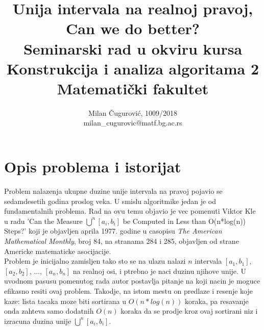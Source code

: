 \documentclass[a4paper]{article}
\begin{document}
\title{Unija intervala na realnoj pravoj, \\ Can we do better? \\  \small{Seminarski rad u okviru kursa\\Konstrukcija i analiza algoritama 2\\ Matematički fakultet}}

\author{Milan Čugurović, 1009/2018\\ milan\_cugurovic@matf.bg.ac.rs}
\maketitle


\tableofcontents

\newpage

\section{Opis problema i istorijat}
Problem nalazenja ukupne duzine unije intervala na pravoj pojavio se sedamdesetih godina proslog veka. U smislu algoritmike jedan je od fundamentalnih problema. Rad na ovu temu objavio je vec pomenuti Viktor Kle u radu 'Can the Measure $\bigcup^n [a_i, b_i]$ be Computed in Less than O(n*log(n)) Steps?'\cite{vklee} koji je objavljen aprila 1977. godine u casopisu \textit{The American Mathematical Monthly}, broj 84, na stranama 284 i 285, objavljen od strane Americke matematicke asocijacije. \\

Problem je inicijalno zamisljen tako sto se na ulazu nalazi $n$ intervala $[a_1, b_1]$, $[a_2, b_2]$, ..., $[a_n, b_n]$ na realnoj osi, i ptrebno je naci duzinu njihove unije. U uvodnom pasusu pomenutog rada autor postavlja pitanje na koji nacin je moguce efikasno resiti ovaj problem. Takodje, na istom mestu on predlaze i resenje koje kaze: lista tacaka moze biti sortirana u $O(n*log(n))$ koraka, pa resavanje onda zahteva samo dodatnih $O(n)$ koraka da se prodje kroz ovaj sortirani niz i izracuna duzina unije $\bigcup^n [a_i, b_i]$. \\
\end{document}
